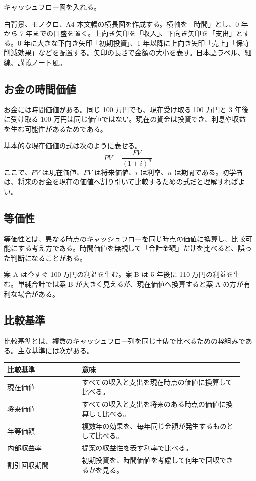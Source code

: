 \documentclass[a4paper,11pt]{article}
\begin{document}
\begin{todobox}
キャッシュフロー図を入れる。
\end{todobox}
\begin{promptbox}
白背景、モノクロ、A4 本文幅の横長図を作成する。横軸を「時間」とし、0 年から 7 年までの目盛を置く。上向き矢印を「収入」、下向き矢印を「支出」とする。0 年に大きな下向き矢印「初期投資」、1 年以降に上向き矢印「売上」「保守削減効果」などを配置する。矢印の長さで金額の大小を表す。日本語ラベル、細線、講義ノート風。
\end{promptbox}

\subsection{お金の時間価値}

お金には時間価値がある。同じ 100 万円でも、現在受け取る 100 万円と 3 年後に受け取る 100 万円は同じ価値ではない。現在の資金は投資でき、利息や収益を生む可能性があるためである。

基本的な現在価値の式は次のように表せる。
\[
PV = \frac{FV}{(1+i)^n}
\]
ここで、$PV$ は現在価値、$FV$ は将来価値、$i$ は利率、$n$ は期間である。初学者は、将来のお金を現在の価値へ割り引いて比較するための式だと理解すればよい。

\subsection{等価性}

等価性とは、異なる時点のキャッシュフローを同じ時点の価値に換算し、比較可能にする考え方である。時間価値を無視して「合計金額」だけを比べると、誤った判断になることがある。

\begin{examplebox}
案 A は今すぐ 100 万円の利益を生む。案 B は 5 年後に 110 万円の利益を生む。単純合計では案 B が大きく見えるが、現在価値へ換算すると案 A の方が有利な場合がある。
\end{examplebox}

\subsection{比較基準}

比較基準とは、複数のキャッシュフロー列を同じ土俵で比べるための枠組みである。主な基準には次がある。

\begin{longtable}{L{0.30\linewidth} L{0.65\linewidth}}
\toprule
\textbf{比較基準} & \textbf{意味} \\
\midrule
現在価値 & すべての収入と支出を現在時点の価値に換算して比べる。 \\
将来価値 & すべての収入と支出を将来のある時点の価値に換算して比べる。 \\
年等価額 & 複数年の効果を、毎年同じ金額が発生するものとして比べる。 \\
内部収益率 & 提案の収益性を表す利率で比べる。 \\
割引回収期間 & 初期投資を、時間価値を考慮して何年で回収できるかを見る。 \\
\bottomrule
\end{longtable}
\end{document}
